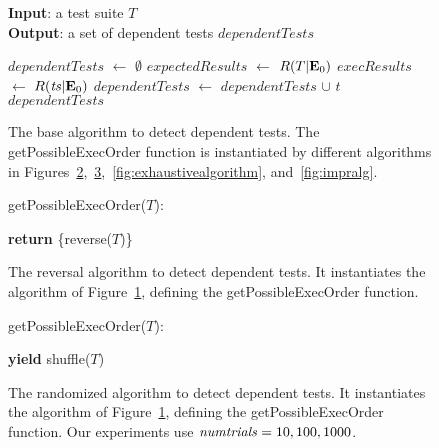 \begin{figure}[t]
\textbf{Input}: a test suite $\mathit{T}$\\
\textbf{Output}: a set of dependent tests $\mathit{dependentTests}$\\
\bigsqueeze
\begin{algorithmic}[1]
\STATE $\mathit{dependentTests}$ $\leftarrow$ $\emptyset$
\STATE $\mathit{expectedResults}$ $\leftarrow$ $R(T|\mathbf{E}_0)$
\STATE $\mathit{execResults}$ $\leftarrow$ $R(\mathit{ts}|\mathbf{E}_0)$
\STATE $\mathit{dependentTests}$ $\leftarrow$ $\mathit{dependentTests}$ $\cup$ $\mathit{t}$
\ENDIF
\ENDFOR
\ENDFOR
\RETURN $\mathit{dependentTests}$
\end{algorithmic}


\caption {The base algorithm to detect dependent tests.
$\!$The getPossibleExecOrder function is instantiated
by different algorithms in
Figures~\ref{fig:reversal-algorithm},~$\!$\ref{fig:randalgorithm},~$\!$\ref{fig:exhaustivealgorithm},
and~\ref{fig:impralg}.
}
\label{fig:basealgorithm}
\end{figure}

\begin{figure}[t]
getPossibleExecOrder($T$):\\
\bigsqueeze
\begin{algorithmic}[1]
\STATE \textbf{return} \{reverse($T$)\}
\end{algorithmic}

\caption {The reversal algorithm to detect dependent tests.
It instantiates the algorithm of Figure~\ref{fig:basealgorithm},
defining the getPossibleExecOrder function.
}
\label{fig:reversal-algorithm}
\end{figure}


\begin{figure}[t]
getPossibleExecOrder($T$):\\
\bigsqueeze
\begin{algorithmic}[1]
\STATE \textbf{yield} shuffle($T$)
\ENDFOR
\end{algorithmic}
\caption {The randomized algorithm to detect dependent tests.
It instantiates the algorithm of Figure~\ref{fig:basealgorithm}, defining
the getPossibleExecOrder function.
Our experiments use $\mathit{numtrials} = 10,
100, 1000$.}
\label{fig:randalgorithm}
\end{figure}

